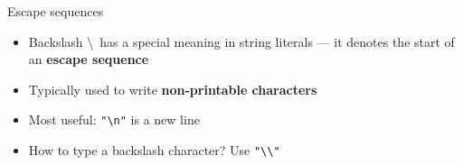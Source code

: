 
\begin{frame}[fragile]{Escape sequences}
    \begin{itemize}
        \pause\item Backslash \textbackslash\ has a special meaning in string literals
            --- it denotes the start of an \textbf{escape sequence}
        \pause\item Typically used to write \textbf{non-printable characters}
        \pause\item Most useful: \lstinline{"\n"} is a new line
        \pause\item How to type a backslash character? Use \lstinline{"\\"}
    \end{itemize}
\end{frame}


